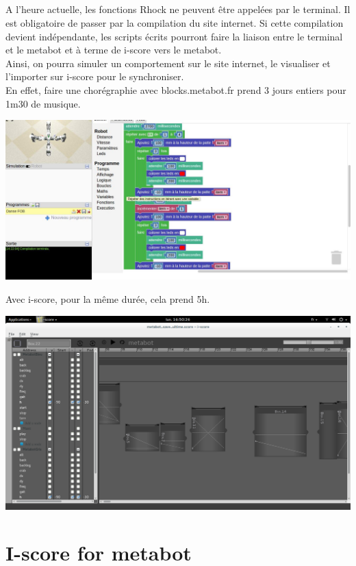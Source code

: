 \documentclass[10pt,a4paper]{report}
\begin{document}
\paragraph{}
A l'heure actuelle, les fonctions Rhock ne peuvent être appelées par le terminal. Il est obligatoire de passer par la compilation du site internet. Si cette compilation devient indépendante, les scripts écrits pourront faire la liaison entre le terminal et le metabot et à terme de i-score vers le metabot.
\\
Ainsi, on pourra simuler un comportement sur le site internet, le visualiser et l'importer sur i-score pour le synchroniser.
\\
En effet, faire une chorégraphie avec blocks.metabot.fr prend 3 jours entiers pour 1m30 de musique. 
\begin{center}
\includegraphics[scale=0.1]{image/site.jpg}
\end{center}
Avec i-score, pour la même durée, cela prend 5h.

\begin{center}
\includegraphics[scale=0.1]{image/danse.png}
\end{center}

\chapter{I-score for metabot}
\end{document}
